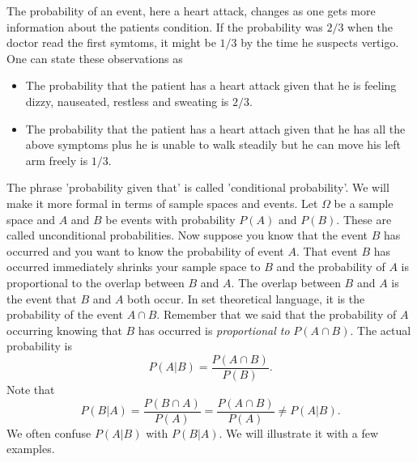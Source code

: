 \documentclass{article}
\begin{document}
The probability of an event, here a heart attack, changes as one gets more
information about the patients condition. If the probability was $2/3$ when
the doctor read the first symtoms, it might be $1/3$ by the time he suspects
vertigo. One can state these observations as
\begin{itemize}
\item The probability that the patient has a heart attack given that he is
feeling dizzy, nauseated, restless and sweating is $2/3$.
\item The probability that the patient has a heart attach given that he has
all the above symptoms plus he is unable to walk steadily but he can move
his left arm freely is $1/3$.
\end{itemize}
The phrase 'probability given that' is called 'conditional probability'. We
will make it more formal in terms of sample spaces and events. Let $\Omega$
be a sample space and $A$ and $B$ be events with probability $P(A)$ and
$P(B)$. These are called unconditional probabilities. Now suppose you know
that the event $B$ has occurred and you want to know the probability of 
event $A$. That event $B$ has occurred immediately shrinks your sample 
space to $B$ and the probability of $A$ is proportional to the overlap
between $B$ and $A$. The overlap between $B$ and $A$ is the event that
$B$ and $A$ both occur. In set theoretical language, it is the probability
of the event $A \cap B$. Remember that we said that the probability of $A$
occurring knowing that $B$ has occurred is \emph{proportional to} 
$P(A \cap B)$. The actual probability is
\begin{equation}\label{e18}
P(A | B) = \frac{P(A \cap B)}{P(B)}.
\end{equation}
Note that
\begin{equation}\label{e19}
P(B | A) = \frac{P(B \cap A)}{P(A)} = \frac{P(A \cap B)}{P(A)} \ne
P(A | B).
\end{equation}
We often confuse $P(A|B)$ with $P(B|A)$. We will illustrate it with a
few examples.
\end{document}
